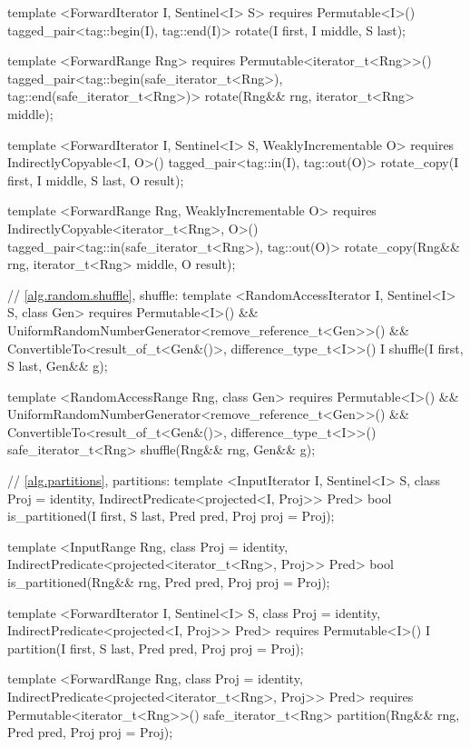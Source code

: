 \begin{codeblock}
{{{{  template <ForwardIterator I, Sentinel<I> S>
    requires Permutable<I>()
    tagged_pair<tag::begin(I), tag::end(I)>
      rotate(I first, I middle, S last);

  template <ForwardRange Rng>
    requires Permutable<iterator_t<Rng>>()
    tagged_pair<tag::begin(safe_iterator_t<Rng>),
                tag::end(safe_iterator_t<Rng>)>
      rotate(Rng&& rng, iterator_t<Rng> middle);

  template <ForwardIterator I, Sentinel<I> S, WeaklyIncrementable O>
    requires IndirectlyCopyable<I, O>()
    tagged_pair<tag::in(I), tag::out(O)>
      rotate_copy(I first, I middle, S last, O result);

  template <ForwardRange Rng, WeaklyIncrementable O>
    requires IndirectlyCopyable<iterator_t<Rng>, O>()
    tagged_pair<tag::in(safe_iterator_t<Rng>), tag::out(O)>
      rotate_copy(Rng&& rng, iterator_t<Rng> middle, O result);

  // \ref{alg.random.shuffle}, shuffle:
  template <RandomAccessIterator I, Sentinel<I> S, class Gen>
    requires Permutable<I>() &&
      UniformRandomNumberGenerator<remove_reference_t<Gen>>() &&
      ConvertibleTo<result_of_t<Gen&()>, difference_type_t<I>>()
    I shuffle(I first, S last, Gen&& g);

  template <RandomAccessRange Rng, class Gen>
    requires Permutable<I>() &&
      UniformRandomNumberGenerator<remove_reference_t<Gen>>() &&
      ConvertibleTo<result_of_t<Gen&()>, difference_type_t<I>>()
    safe_iterator_t<Rng>
      shuffle(Rng&& rng, Gen&& g);

  // \ref{alg.partitions}, partitions:
  template <InputIterator I, Sentinel<I> S, class Proj = identity,
      IndirectPredicate<projected<I, Proj>> Pred>
    bool is_partitioned(I first, S last, Pred pred, Proj proj = Proj{});

  template <InputRange Rng, class Proj = identity,
      IndirectPredicate<projected<iterator_t<Rng>, Proj>> Pred>
    bool
      is_partitioned(Rng&& rng, Pred pred, Proj proj = Proj{});

  template <ForwardIterator I, Sentinel<I> S, class Proj = identity,
      IndirectPredicate<projected<I, Proj>> Pred>
    requires Permutable<I>()
    I partition(I first, S last, Pred pred, Proj proj = Proj{});

  template <ForwardRange Rng, class Proj = identity,
      IndirectPredicate<projected<iterator_t<Rng>, Proj>> Pred>
    requires Permutable<iterator_t<Rng>>()
    safe_iterator_t<Rng>
      partition(Rng&& rng, Pred pred, Proj proj = Proj{});

}}}}
\end{codeblock}
